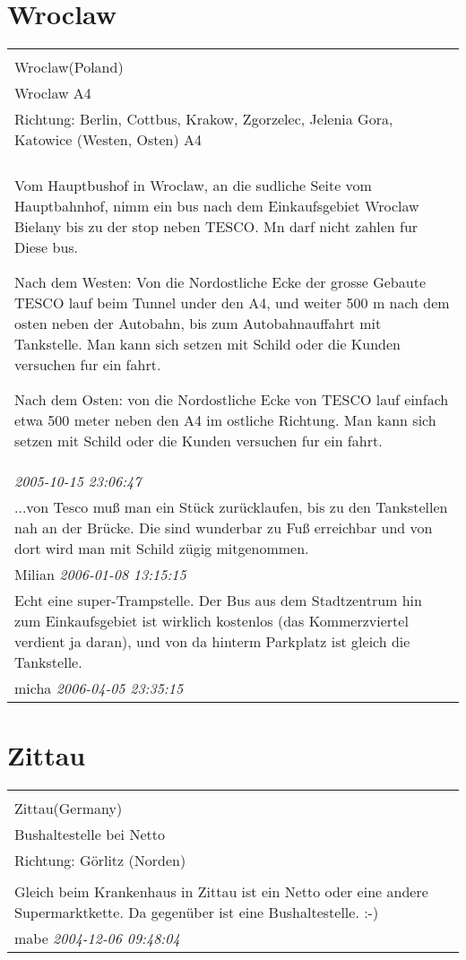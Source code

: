 \documentclass[a4paper,12pt]{article}
\begin{document}
\section{Wroclaw}
\begin{tabular}{|p{13cm}|}
\hline\\
Wroclaw(Poland)\\
Wroclaw A4\\
Richtung: Berlin, Cottbus, Krakow, Zgorzelec, Jelenia Gora, Katowice (Westen, Osten) A4 \\
\hline\\
Vom Hauptbushof in Wroclaw, an die sudliche Seite vom Hauptbahnhof, nimm ein bus nach dem Einkaufsgebiet Wroclaw Bielany bis zu der stop neben TESCO. Mn darf nicht zahlen fur Diese bus.


Nach dem Westen: Von die Nordostliche Ecke der grosse Gebaute TESCO lauf beim Tunnel under den A4, und weiter 500 m nach dem osten neben der Autobahn, bis zum Autobahnauffahrt mit Tankstelle. Man kann sich setzen mit Schild oder die Kunden versuchen fur ein fahrt.

Nach dem Osten: von die Nordostliche Ecke von TESCO lauf einfach etwa 500 meter neben den A4 im ostliche Richtung. Man kann sich setzen mit Schild oder die Kunden versuchen fur ein fahrt.
\\
\textit{ 2005-10-15 23:06:47 }\\\hline ...von Tesco muß man ein Stück zurücklaufen, bis zu den Tankstellen nah an der Brücke. Die sind wunderbar zu Fuß erreichbar und von dort wird man mit Schild zügig mitgenommen. \\
Milian \textit{ 2006-01-08 13:15:15 }\\\hline Echt eine super-Trampstelle. Der Bus aus dem Stadtzentrum hin zum Einkaufsgebiet ist wirklich kostenlos (das Kommerzviertel verdient ja daran), und von da hinterm Parkplatz ist gleich die Tankstelle. \\
micha \textit{ 2006-04-05 23:35:15 }\\\hline
\end{tabular}


\section{Zittau}
\begin{tabular}{|p{13cm}|}
\hline\\
Zittau(Germany)\\
Bushaltestelle bei Netto\\
Richtung: Görlitz (Norden) \\
\hline\\
Gleich beim Krankenhaus in Zittau ist ein Netto oder eine andere Supermarktkette. Da gegenüber ist eine Bushaltestelle. :-) \\
mabe \textit{ 2004-12-06 09:48:04 }\\\hline
\end{tabular}
\end{document}
